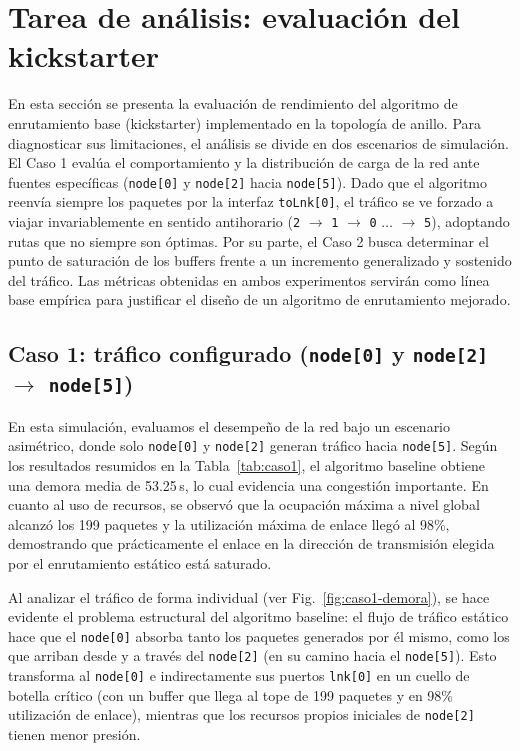 \documentclass[10pt,letterpaper,twocolumn]{article}
\begin{document}
\section{Tarea de análisis: evaluación del kickstarter}
\label{sec:analisis}

En esta sección se presenta la evaluación de rendimiento del algoritmo 
de enrutamiento base (kickstarter) implementado en la topología de anillo. 
Para diagnosticar sus limitaciones, el análisis se divide en dos escenarios 
de simulación. El Caso 1 evalúa el comportamiento y la distribución de 
carga de la red ante fuentes específicas (\texttt{node[0]} y \texttt{node[2]} hacia \texttt{node[5]}). Dado que el algoritmo reenvía siempre los paquetes por la interfaz \texttt{toLnk[0]}, el tráfico se ve forzado a viajar invariablemente en sentido antihorario (\texttt{2} $\to$ \texttt{1} $\to$ \texttt{0} $\dots$ $\to$ \texttt{5}), adoptando rutas que no siempre son óptimas.
Por su parte, el Caso 2 busca determinar el punto de saturación de los 
buffers frente a un incremento generalizado y sostenido del tráfico. 
Las métricas obtenidas en ambos experimentos servirán como línea base 
empírica para justificar el diseño de un algoritmo de enrutamiento mejorado.

\subsection{Caso 1: tráfico configurado (\texttt{node[0]} y \texttt{node[2]} $\rightarrow$ \texttt{node[5]})}
\label{sec:baseline}

En esta simulación, evaluamos el desempeño de la red bajo un escenario asimétrico, donde solo \texttt{node[0]} y \texttt{node[2]} generan tráfico hacia \texttt{node[5]}. Según los resultados resumidos en la Tabla~\ref{tab:caso1}, el algoritmo baseline obtiene una demora media de 53.25\,s, lo cual evidencia una congestión importante. En cuanto al uso de recursos, se observó que la ocupación máxima a nivel global alcanzó los 199 paquetes y la utilización máxima de enlace llegó al 98\%, demostrando que prácticamente el enlace en la dirección de transmisión elegida por el enrutamiento estático está saturado.

Al analizar el tráfico de forma individual (ver Fig.~\ref{fig:caso1-demora}), se hace evidente el problema estructural del algoritmo baseline: el flujo de tráfico estático hace que el \texttt{node[0]} absorba tanto los paquetes generados por él mismo, como los que arriban desde y a través del \texttt{node[2]} (en su camino hacia el \texttt{node[5]}). Esto transforma al \texttt{node[0]} e indirectamente sus puertos \texttt{lnk[0]} en un cuello de botella crítico (con un buffer que llega al tope de 199 paquetes y en 98\% utilización de enlace), mientras que los recursos propios iniciales de \texttt{node[2]} tienen menor presión.
\end{document}
